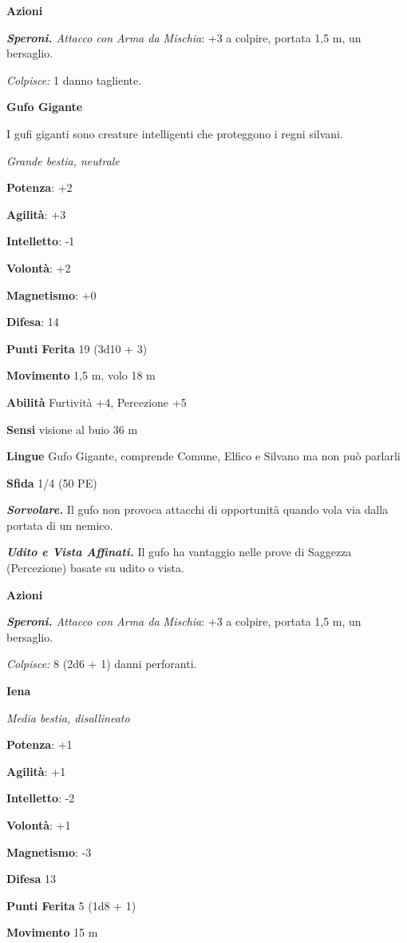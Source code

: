 \begin{multicols}{2}
\textbf{Azioni}

\emph{\textbf{Speroni.} Attacco con Arma da Mischia}: +3 a colpire,
portata 1,5 m, un bersaglio.

\emph{Colpisce:} 1 danno tagliente.

\textbf{Gufo Gigante}

I gufi giganti sono creature intelligenti che proteggono i regni
silvani.

\emph{Grande bestia, neutrale}

\textbf{Potenza}: +2

\textbf{Agilità}: +3

\textbf{Intelletto}: -1

\textbf{Volontà}: +2

\textbf{Magnetismo}: +0

\textbf{Difesa}: 14

\textbf{Punti Ferita} 19 (3d10 + 3)

\textbf{Movimento} 1,5 m, volo 18 m

\textbf{Abilità} Furtività +4, Percezione +5

\textbf{Sensi} visione al buio 36 m

\textbf{Lingue} Gufo Gigante, comprende Comune, Elfico e Silvano ma non
può parlarli

\textbf{Sfida} 1/4 (50 PE)

\emph{\textbf{Sorvolare.}} Il gufo non provoca attacchi di opportunità
quando vola via dalla portata di un nemico.

\emph{\textbf{Udito e Vista Affinati.}} Il gufo ha vantaggio nelle prove
di Saggezza (Percezione) basate su udito o vista.

\textbf{Azioni}

\emph{\textbf{Speroni.} Attacco con Arma da Mischia}: +3 a colpire,
portata 1,5 m, un bersaglio.

\emph{Colpisce:} 8 (2d6 + 1) danni perforanti.

\textbf{Iena}

\emph{Media bestia, disallineato}

\textbf{Potenza}: +1

\textbf{Agilità}: +1

\textbf{Intelletto}: -2

\textbf{Volontà}: +1

\textbf{Magnetismo}: -3

\textbf{Difesa} 13

\textbf{Punti Ferita} 5 (1d8 + 1)

\textbf{Movimento} 15 m


\end{multicols}
